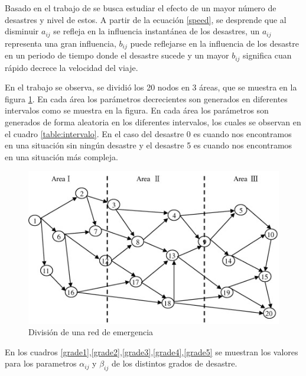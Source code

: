 \documentclass[letter, 10pt]{article}
\begin{document}
Basado en el trabajo de \cite{Yuan20091081} se busca estudiar el efecto de un mayor número de desastres y nivel de estos. A partir de la ecuación \eqref{speed}, se desprende que al disminuir $a_{ij}$ se refleja en la influencia instantánea de los desastres, un  $a_{ij}$ representa una gran influencia, $b_{ij}$ puede reflejarse en la influencia de los desastre en un periodo de tiempo donde el desastre sucede y un mayor $b_{ij}$ significa cuan rápido decrece la velocidad del viaje.


En el trabajo \cite{Yuan20091081} se observa, se dividió los 20 nodos en 3 áreas, que se muestra en la figura \ref{area3}. En cada área los parámetros decrecientes son generados en diferentes intervalos como se muestra en la figura. En cada área los parámetros son generados de forma aleatoria en los diferentes intervalos, los cuales se observan en el cuadro \ref{table:intervalo}. En el caso del desastre 0 es cuando nos encontramos en una situación sin ningún desastre y el desastre 5 es cuando nos encontramos en una situación más compleja.

\begin{figure}[H]
\centering
\includegraphics[scale=1]{images/areas.jpg}
\caption{División de una red de emergencia}\label{area3}

\end{figure}

En los cuadros \ref{grade1},\ref{grade2},\ref{grade3},\ref{grade4},\ref{grade5} se muestran los valores para los parametros $\alpha_{ij}$ y $\beta_{ij}$	de los distintos grados de desastre.
\end{document}

